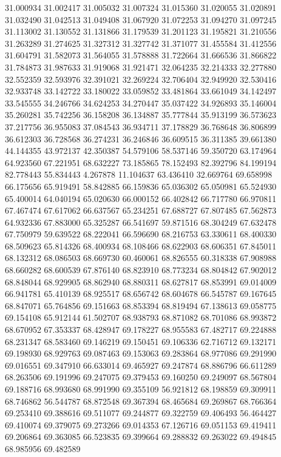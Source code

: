 31.000934
31.002417
31.005032
31.007324
31.015360
31.020055
31.020891
31.032490
31.042513
31.049408
31.067920
31.072253
31.094270
31.097245
31.113002
31.130552
31.131866
31.179539
31.201123
31.195821
31.210556
31.263289
31.274625
31.327312
31.327742
31.371077
31.455584
31.412556
31.604791
31.582073
31.564055
31.578888
31.722664
31.666536
31.866822
31.784873
31.987633
31.919068
31.921471
32.064235
32.214333
32.277880
32.552359
32.593976
32.391021
32.269224
32.706404
32.949920
32.530416
32.933748
33.142722
33.180022
33.059852
33.481864
33.661049
34.142497
33.545555
34.246766
34.624253
34.270447
35.037422
34.926893
35.146004
35.260281
35.742256
36.158208
36.134887
35.777844
35.913199
36.573623
37.217756
36.955083
37.084543
36.934711
37.178829
36.768648
36.806899
36.612303
36.728568
36.274231
36.246846
36.609515
36.311385
39.661380
44.144355
43.972137
42.350387
54.579106
58.537146
59.350720
63.174964
64.923560
67.221951
68.632227
73.185865
78.152493
82.392796
84.199194
82.778443
55.834443
4.267878
11.104637
63.436410
32.669764
69.658998
66.175656
65.919491
58.842885
66.159836
65.036302
65.050981
65.524930
65.400014
64.040194
65.020630
66.000152
66.402842
66.717780
66.970811
67.467474
67.617062
66.637567
65.234251
67.688727
67.807485
67.562873
64.932336
67.883000
65.325287
66.541697
59.871516
68.304249
67.632478
67.750979
59.639522
68.222041
66.596690
68.216753
63.330611
68.400330
68.509623
65.814326
68.400934
68.108466
68.622903
68.606351
67.845011
68.132312
68.086503
68.669730
60.460061
68.826555
60.318338
67.908988
68.660282
68.600539
67.876140
68.823910
68.773234
68.804842
67.902012
68.848044
68.929905
68.862940
68.880311
68.627817
68.853991
69.014009
66.941781
65.410139
68.925517
68.656742
68.604678
66.545787
69.167645
68.847071
65.764856
69.151663
68.853394
68.819494
67.138613
69.058775
69.154108
65.912144
61.502707
68.938793
68.871082
68.701086
68.993872
68.670952
67.353337
68.428947
69.178227
68.955583
67.482717
69.224888
68.231347
68.583460
69.146219
69.150451
69.106336
62.716712
69.132171
69.198930
68.929763
69.087463
69.153063
69.283864
68.977086
69.291990
69.016551
69.347910
66.633014
69.465927
69.247874
68.886796
66.611289
68.263506
69.191996
69.247075
69.379453
69.160250
69.249097
68.567804
69.188716
68.993680
68.991990
69.355109
56.921812
68.198859
69.309911
68.746862
56.544787
68.872548
69.367394
68.465684
69.269867
68.766364
69.253410
69.388616
69.511077
69.244877
69.322759
69.406493
56.464427
69.410074
69.379075
69.273266
69.014353
67.126716
69.051153
69.419411
69.206864
69.363085
66.523835
69.399664
69.288832
69.263022
69.494845
68.985956
69.482589
